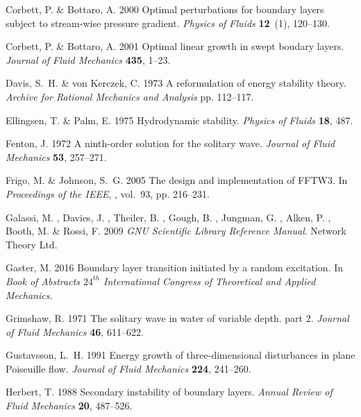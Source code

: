 \documentclass{jfm}
\begin{document}
\begin{thebibliography}{45}
{\sc Corbett, P.  \& Bottaro, A. } 2000 Optimal perturbations for boundary
  layers subject to stream-wise pressure gradient. {\em Physics of Fluids\/}
  {\bf 12}~(1), 120--130.

{\sc Corbett, P.  \& Bottaro, A. } 2001 Optimal linear growth in swept boudary
  layers. {\em Journal of Fluid Mechanics\/} {\bf 435}, 1--23.

{\sc Davis, S.~H.  \& von Kerczek, C. } 1973 A reformulation of energy
  stability theory. {\em Archive for Rational Mechanics and Analysis\/} pp.
  112--117.

{\sc Ellingsen, T.  \& Palm, E. } 1975 Hydrodynamic stability. {\em Physics of
  Fluids\/} {\bf 18}, 487.

{\sc Fenton, J. } 1972 A ninth-order solution for the solitary wave. {\em
  Journal of Fluid Mechanics\/} {\bf 53}, 257--271.

{\sc Frigo, M.  \& Johnson, S.~G. } 2005 The design and implementation of
  {FFTW3}. In {\em Proceedings of the IEEE\/}, , vol.~93, pp. 216--231.

{\sc Galassi, M. , Davies, J. , Theiler, B. , Gough, B. , Jungman, G. , Alken,
  P. , Booth, M.  \& Rossi, F. } 2009 {\em {GNU} Scientific Library Reference
  Manual\/}. Network Theory Ltd.

{\sc Gaster, M. } 2016 Boundary layer transition initiated by a random
  excitation. In {\em Book of Abstracts $ 24^{th} $ International Congress of
  Theoretical and Applied Mechanics\/}.

{\sc Grimshaw, R. } 1971 The solitary wave in water of variable depth. part 2.
  {\em Journal of Fluid Mechanics\/} {\bf 46}, 611--622.

{\sc Gustavsson, L.~H. } 1991 Energy growth of three-dimensional disturbances
  in plane {P}oiseuille flow. {\em Journal of Fluid Mechanics\/} {\bf 224},
  241--260.

{\sc Herbert, T. } 1988 Secondary instability of boundary layers. {\em Annual
  Review of Fluid Mechanics\/} {\bf 20}, 487--526.


\end{thebibliography}
\end{document}
